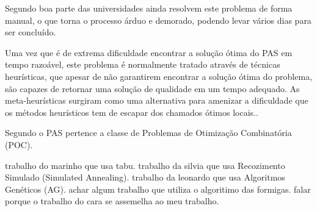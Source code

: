Segundo \cite{souza2000} boa parte das universidades ainda resolvem este problema de forma manual, o que torna o processo árduo e demorado, podendo levar vários dias para ser concluído.\par

Uma vez que é de extrema dificuldade encontrar a solução ótima do PAS em tempo razoável, este problema é normalmente tratado através de técnicas heurísticas, que apesar de não garantirem encontrar a solução ótima do problema, são capazes de retornar uma solução de qualidade em um tempo adequado. As meta-heurísticas surgiram como uma alternativa para amenizar a dificuldade que os métodos heurísticos tem de escapar dos chamados ótimos locais.\cite{nascimento2005aplicaccao}.\par

Segundo \cite{even1975complexity} o PAS pertence a classe de Problemas de Otimização Combinatória (POC).\par


trabalho do marinho que usa tabu.
trabalho da silvia que usa Recozimento Simulado (Simulated Annealing).
trabalho da leonardo que usa Algoritmos Genéticos (AG).
achar algum trabalho que utiliza o algoritimo das formigas.
falar porque o trabalho do cara se assemelha ao meu trabalho.